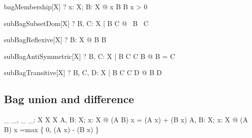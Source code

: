 \documentclass{article}
\begin{document}
\begin{theorem}{bagMembership}[X]
    \vdash? \forall x: X; B: \bag X @ x \inbag B \iff B \bcount x > 0
\end{theorem}
\begin{theorem}{subBagSubsetDom}[X]
    \vdash? \forall B, C: \bag X | B \subbageq C @ \dom~B \subseteq \dom~C
\end{theorem}
\begin{theorem}{subBagReflexive}[X]
    \vdash? \forall B: \bag X @ B \subbageq B
\end{theorem}
\begin{theorem}{subBagAntiSymmetric}[X]
    \vdash? \forall B, C: \bag X | B \subbageq C \land C \subbageq B @ B = C
\end{theorem}
\begin{theorem}{subBagTransitive}[X]
    \vdash? \forall B, C, D: \bag X | B \subbageq C \land C \subbageq D @ B \subbageq D
\end{theorem}

\subsection{Bag union and difference}

\begin{gendef}[X]
  \_ \uplus \_, \_ \uminus \_:  \bag X \cross \bag X \fun \bag X
\where
  \forall A, B: \bag X; x: X @
      (A \uplus B) \bcount x = (A \bcount x) + (B \bcount x)
\also
  \forall A, B: \bag X; x: X @
     (A \uminus B) \bcount x =max \{ 0, (A \bcount x) - (B \bcount x) \}
\end{gendef}
\end{document}
